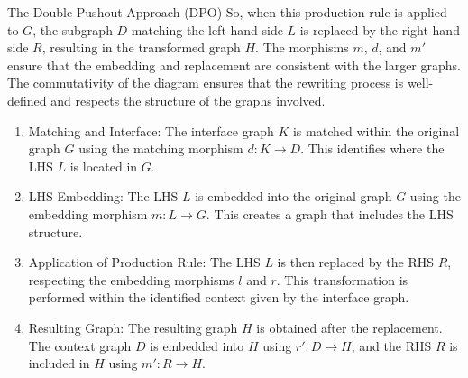 \begin{definition}{The Double Pushout Approach (DPO)}
	So, when this production rule is applied to $G$, the subgraph $D$ matching the left-hand side $L$ is replaced by the right-hand side $R$, resulting in the transformed graph $H$. The morphisms $m$, $d$, and $m'$ ensure that the embedding and replacement are consistent with the larger graphs. The commutativity of the diagram ensures that the rewriting process is well-defined and respects the structure of the graphs involved.
	
	\begin{enumerate}
		\item Matching and Interface: The interface graph $K$ is matched within the original graph $G$ using the matching morphism $d: K \to D$. This identifies where the LHS $L$ is located in $G$.
		
		\item LHS Embedding: The LHS $L$ is embedded into the original graph $G$ using the embedding morphism $m: L \to G$. This creates a graph that includes the LHS structure.
		
		\item Application of Production Rule: The LHS $L$ is then replaced by the RHS $R$, respecting the embedding morphisms $l$ and $r$. This transformation is performed within the identified context given by the interface graph.
		
		\item Resulting Graph: The resulting graph $H$ is obtained after the replacement. The context graph $D$ is embedded into $H$ using $r': D \to H$, and the RHS $R$ is included in $H$ using $m': R \to H$.
	\end{enumerate}
\end{definition}

